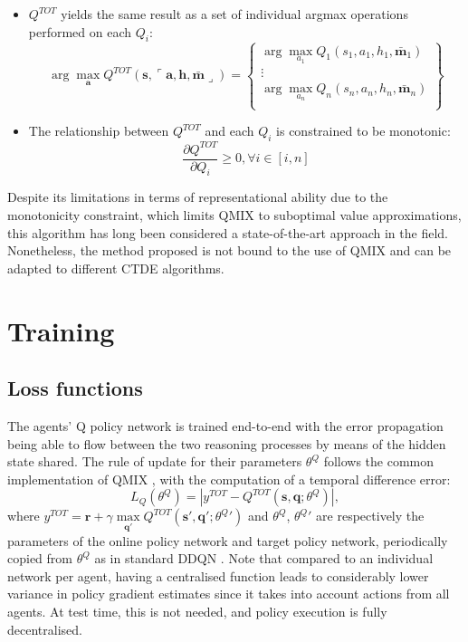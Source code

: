 \documentclass[a4paper,singleside,12pt]{report} %
\begin{document}
\begin{itemize}
\item
  \(Q^{TOT}\) yields the same result as a set of individual argmax operations performed on each \(Q_i\):
  \begin{equation}
  \arg\max_{\textbf{a}} Q^{TOT}(\textbf{s},\ulcorner\textbf{a},\textbf{h},\bar{\textbf{m}}\lrcorner) = \begin{Bmatrix}
  \arg\max_{a_1} Q_1(s_1,a_1,h_1,\bar{\textbf{m}}_1) \\
  \vdots\\
  \arg\max_{a_n} Q_n(s_n,a_n,h_n,\bar{\textbf{m}}_n) \\
  \end{Bmatrix}
  \end{equation}
\item
  The relationship between \(Q^{TOT}\) and each \(Q_i\) is constrained to be monotonic:
  \begin{equation}
  \frac{\partial Q^{TOT}}{\partial Q_i} \geq 0, \forall i \in [i,n]
  \end{equation}
\end{itemize}

Despite its limitations in terms of representational ability due to the monotonicity constraint, which limits QMIX to suboptimal value approximations, this algorithm has long been considered a state-of-the-art approach in the field. Nonetheless, the method proposed is not bound to the use of QMIX and can be adapted to different CTDE algorithms.

\section{Training}\label{training}

\subsection{Loss functions}\label{loss}
The agents' Q policy network is trained end-to-end with the error propagation being able to flow between the two reasoning processes by means of the hidden state shared. The rule of update for their parameters \(\theta^Q\) follows the common implementation of QMIX \cite{Rashid2018QMIXMV}, with the computation of a temporal difference error:
  \begin{equation}
    L_Q(\theta^Q) = |y^{TOT} - Q^{TOT}(\textbf{s}, \textbf{q}; \theta^Q)|,
  \end{equation}
where $y^{TOT} = \textbf{r} + \gamma \max\limits_{\textbf{q}'}Q^{TOT}(\textbf{s}', \textbf{q}'; \theta^{Q}{'})$ and \(\theta^Q\), \(\theta^{Q}{'}\) are respectively the parameters of the online policy network and target policy network, periodically copied from \(\theta^Q\) as in standard DDQN \cite{Van2016deep}. Note that compared to an individual network per agent, having a centralised function leads to considerably lower variance in policy gradient estimates since it takes into account actions from all agents. At test time, this is not needed, and policy execution is fully decentralised.
\end{document}
